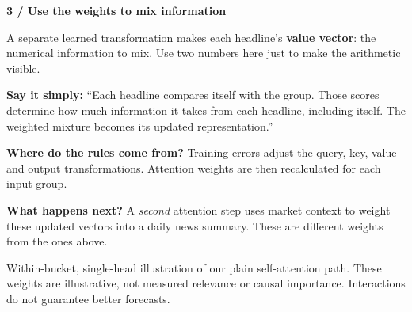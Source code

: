 \documentclass[11pt,a4paper,landscape]{article}
\newcommand{\sub}[1]{{\large\bfseries\color{navy}#1}\par}
\newcommand{\callout}[1]{\par\colorbox{pale}{\parbox{\dimexpr\linewidth-2\fboxsep}{\vspace{5pt}#1\vspace{5pt}}}\par}
\begin{document}
\begin{minipage}[t]{.50\linewidth}
\sub{3 / Use the weights to mix information}
A separate learned transformation makes each headline's \textbf{value vector}: the numerical information to mix. Use two numbers here just to make the arithmetic visible.

\begin{center}
\end{center}
\end{minipage}

\callout{\textbf{Say it simply:} ``Each headline compares itself with the group. Those scores determine how much information it takes from each headline, including itself. The weighted mixture becomes its updated representation.''}
\begin{minipage}[t]{.49\linewidth}
\textbf{Where do the rules come from?} Training errors adjust the query, key, value and output transformations. Attention weights are then recalculated for each input group.
\end{minipage}\hfill
\begin{minipage}[t]{.47\linewidth}
\textbf{What happens next?} A \emph{second} attention step uses market context to weight these updated vectors into a daily news summary. These are different weights from the ones above.
\end{minipage}
\vfill
{\scriptsize\color{slate}Within-bucket, single-head illustration of our plain self-attention path. These weights are illustrative, not measured relevance or causal importance. Interactions do not guarantee better forecasts.}
\end{document}
